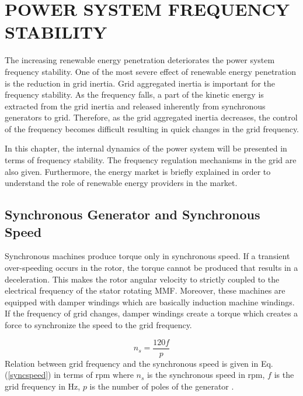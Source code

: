 \chapter{POWER SYSTEM FREQUENCY STABILITY}
\label{chp:2}
The increasing renewable energy penetration deteriorates the power system frequency stability. One of the most severe effect of renewable energy penetration is the reduction in grid inertia. Grid aggregated inertia is important for the frequency stability. As the frequency falls, a part of the kinetic energy is extracted from the grid inertia and released inherently from synchronous generators to grid. Therefore, as the grid aggregated inertia decreases, the control of the frequency becomes difficult resulting in quick changes in the grid frequency.\par
In this chapter, the internal dynamics of the power system will be presented in terms of frequency stability. The frequency regulation mechanisms in the grid are also given. Furthermore, the energy market is briefly explained in order to understand the role of renewable energy providers in the market.
\section{Synchronous Generator and Synchronous Speed}
Synchronous machines produce torque only in synchronous speed. If a transient over-speeding occurs in the rotor, the torque cannot be produced that results in a deceleration. This makes the rotor angular velocity to strictly coupled to the electrical frequency  of the stator rotating MMF. Moreover, these machines are equipped with damper windings which are basically induction machine windings. If the frequency of  grid changes, damper windings create a torque which creates a force to synchronize the speed to the grid frequency. \par
\begin{equation}
n_{s}=\frac{120f}{p}
\label{syncspeed}
\end{equation}
Relation between grid frequency and the synchronous speed is given in Eq. (\ref{syncspeed}) in terms of rpm where $n_{s}$ is the synchronous speed in rpm, $f$ is the grid frequency in Hz, $p$ is the number of poles of the generator \cite{Kundur}.

